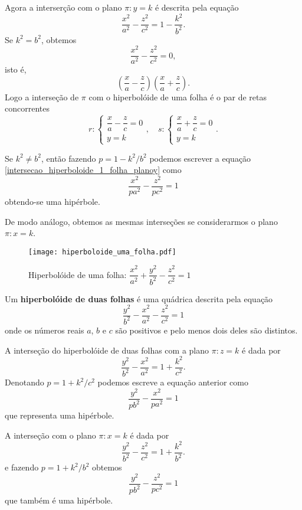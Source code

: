 Agora a interser\c{c}\~ao com o plano $\pi : y = k$ \'e descrita pela equa\c{c}\~ao
\begin{equation}\label{intersecao_hiperboloide_1_folha_planoy}
	\dfrac{x^2}{a^2} - \dfrac{z^2}{c^2} = 1 - \dfrac{k^2}{b^2}.
\end{equation}
Se $k^2 = b^2$, obtemos
\[
	\dfrac{x^2}{a^2} - \dfrac{z^2}{c^2} = 0,	
\]
isto \'e,
\[
	\left(\dfrac{x}{a} - \dfrac{z}{c}\right)\left(\dfrac{x}{a} + \dfrac{z}{c}\right).
\]
Logo a interse\c{c}\~ao de $\pi$ com o hiperbol\'oide de uma folha \'e o par de retas concorrentes
\[
	r : \begin{cases}
		\dfrac{x}{a} - \dfrac{z}{c} = 0\\
		y = k
	\end{cases}, \quad s : \begin{cases}
		\dfrac{x}{a} + \dfrac{z}{c} = 0\\
		y = k
	\end{cases}.
\]

Se $k^2 \ne b^2$, ent\~ao fazendo $p = 1 - k^2/b^2$ podemos escrever a equa\c{c}\~ao \eqref{intersecao_hiperboloide_1_folha_planoy} como
\[
	\dfrac{x^2}{pa^2} - \dfrac{z^2}{pc^2} = 1	
\]
obtendo-se uma hip\'erbole.

De modo an\'alogo, obtemos as mesmas interse\c{c}\~oes se considerarmos o plano $\pi : x = k$.
\begin{figure}[h]
	\centering
	\caption{Hiperbol\'oide de uma folha: $\dfrac{x^2}{a^2} + \dfrac{y^2}{b^2} - \dfrac{z^2}{c^2} = 1$}
	\texttt{[image: hiperboloide\_uma\_folha.pdf]}
\end{figure}

\begin{definicao}
	Um \textbf{hiperbol\'oide de duas folhas} \'e uma qu\'adrica descrita pela equa\c{c}\~ao
	\[
		\dfrac{y^2}{b^2} - \dfrac{x^2}{a^2} - \dfrac{z^2}{c^2} = 1
	\]
	onde os n\'umeros reais $a$, $b$ e $c$ s\~ao positivos e pelo menos dois deles s\~ao distintos.
\end{definicao}

A interse\c{c}\~ao do hiperbol\'oide de duas folhas com a plano $\pi: z = k$ \'e dada por
\[
	\dfrac{y^2}{b^2} - \dfrac{x^2}{a^2} = 1 +  \dfrac{k^2}{c^2}.
\]
Denotando $p = 1 + k^2/c^2$ podemos escreve a equa\c{c}\~ao anterior como
\[
	\dfrac{y^2}{pb^2} - \dfrac{x^2}{pa^2} = 1
\]
que representa uma hip\'erbole.

A interse\c{c}\~ao com o plano $\pi: x = k$ \'e dada por
\[
	\dfrac{y^2}{b^2} - \dfrac{z^2}{c^2} = 1 +  \dfrac{k^2}{b^2}.
\]
e fazendo $p = 1 + k^2/b^2$ obtemos
\[
	\dfrac{y^2}{pb^2} - \dfrac{z^2}{pc^2} = 1
\]
que tamb\'em \'e uma hip\'erbole.

